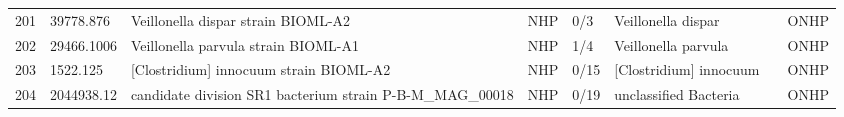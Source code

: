 \begin{longtable}{llllllll}
201 &     39778.876 &                                       Veillonella dispar strain BIOML-A2 &   NHP &       0/3 &                             Veillonella dispar &                    \cite{poyet2019library,cobo2020bacteremia} &  ONHP \\
202 &    29466.1006 &                                      Veillonella parvula strain BIOML-A1 &   NHP &       1/4 &                            Veillonella parvula &                      \cite{poyet2019library,knapp2017natural} &  ONHP \\
203 &      1522.125 &                                   [Clostridium] innocuum strain BIOML-A2 &   NHP &      0/15 &                         [Clostridium] innocuum &                   \cite{poyet2019library,chia2017clostridium} &  ONHP \\
204 &    2044938.12 &                candidate division SR1 bacterium strain P-B-M\_MAG\_00018 &   NHP &      0/19 &                          unclassified Bacteria &                                         \cite{perez2014newly} &  ONHP \\
\end{longtable}
